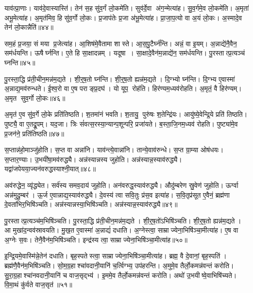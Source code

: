 याव॑त्प्रा॒णाः। याव॑दे॒वास्यास्ति॑। तेन॑ स॒ह सु॑व॒र्गं लो॒कमे॑ति। सुव॑र्दे॒वा अ॑ग॒न्मेत्या॑ह। सु॒व॒र्गमे॒व लो॒कमे॑ति। अ॒मृता॑ अभू॒मेत्या॑ह। अ॒मृत॑मिव॒ हि सु॑व॒र्गो लो॒कः। प्र॒जाप॑तेः प्र॒जा अ॑भू॒मेत्या॑ह। प्रा॒जा॒प॒त्यो वा अ॒यं लो॒कः। अ॒स्मादे॒व तेन॑ लो॒कान्नैति॑॥४४॥

सम॒हं प्र॒जया॒ सं मया प्र॒जेत्या॑ह। आ॒शिष॑मे॒वैतामा शास्ते। आ॒स॒पु॒टैर्घ्न॑न्ति। अन्नं॒ वा इ॒यम्। अ॒न्नाद्ये॑नै॒वैन॒ सम॑र्धयन्ति। ऊषैर्घ्नन्ति। ए॒ते हि सा॒क्षादन्नम्। यदूषा। सा॒क्षादे॒वैन॑म॒न्नाद्ये॑न॒ सम॑र्धयन्ति। पु॒रस्तात्प्र॒त्यञ्चं घ्नन्ति॥४५॥

पु॒रस्ता॒द्धि प्र॑ती॒चीन॒मन्न॑म॒द्यते। शी॒र्॒ष॒तो घ्न॑न्ति। शी॒र्॒ष॒तो ह्यन्न॑म॒द्यते। दि॒ग्भ्यो घ्न॑न्ति। दि॒ग्भ्य ए॒वास्मा॑ अ॒न्नाद्य॒मव॑रुन्धते। ई॒श्व॒रो वा ए॒ष पराङ्प्र॒दघ॑। यो यूप॒ रोह॑ति। हिर॑ण्यम॒ध्यव॑रोहति। अ॒मृतं॒ वै हिर॑ण्यम्। अ॒मृत सुव॒र्गो लो॒कः॥४६॥

अ॒मृत॑ ए॒व सु॑व॒र्गे लो॒के प्रति॑तिष्ठति। श॒तमा॑नं भवति। श॒तायु॒ पुरु॑षः श॒तेन्द्रि॑यः। आयु॑ष्ये॒वेन्द्रि॒ये प्रति॑ तिष्ठति। पुष्ट्यै॒ वा ए॒तद्रू॒पम्। यद॒जा। त्रिः सं॑वत्स॒रस्या॒न्यान्प॒शून्परि॒ प्रजा॑यते। ब॒स्ता॒जि॒नम॒ध्यव॑ रोहति। पुष्ट्या॑मे॒व प्र॒जन॑ने॒ प्रति॑तिष्ठति॥४७॥\anuvakamend[प॒रि॒धा॒पय॑ति गो॒धूमा॑ जुहोति॒ स्वं नैति॑ प्र॒त्यञ्चं घ्नन्ति लो॒को नव॑ च]

स॒प्तान्न॑हो॒माञ्जु॑होति। स॒प्त वा अन्ना॑नि। याव॑न्त्ये॒वान्ना॑नि। तान्ये॒वाव॑रुन्धे। स॒प्त ग्रा॒म्या ओष॑धयः। स॒प्तार॒ण्याः। उ॒भयी॑षा॒मव॑रुद्ध्यै। अन्न॑स्यान्नस्य जुहोति। अन्न॑स्यान्न॒स्या\-व॑रुद्ध्यै। यद्वा॑जपेयया॒ज्यन॑वरुद्धस्याश्नी॒यात्॥४८॥

अव॑रुद्धेन॒ व्यृ॑द्ध्येत। सर्व॑स्य समव॒दाय॑ जुहोति। अन॑वरुद्ध॒स्याव॑रुद्ध्यै। औदु॑म्बरेण स्रु॒वेण॑ जुहोति। ऊर्ग्वा अन्न॑मुदु॒म्बर॑। ऊ॒र्ज ए॒वान्नाद्य॒स्याव॑रुद्ध्यै। दे॒वस्य॑ त्वा सवि॒तुः प्र॑स॒व इत्या॑ह। स॒वि॒तृप्र॑सूत ए॒वैनं॒ ब्रह्म॑णा दे॒वता॑भिर॒भिषि॑ञ्चति। अन्न॑स्यान्नस्या॒भिषि॑ञ्चति। अन्न॑स्यान्न॒स्याव॑रुद्ध्यै॥४९॥

पु॒रस्तात्प्र॒त्यञ्च॑म॒भिषि॑ञ्चति। पु॒रस्ता॒द्धि प्र॑ती॒चीन॒मन्न॑म॒द्यते। शी॒र्॒ष॒तो॑ऽभिषि॑ञ्चति। शी॒र्॒ष॒तो ह्यन्न॑म॒द्यते। आ मुखा॑द॒न्वव॑स्रावयति। मु॒ख॒त ए॒वास्मा॑ अ॒न्नाद्यं॑ दधाति। अ॒ग्नेस्त्वा॒ साम्राज्येना॒भिषि॑ञ्चा॒मीत्या॑ह। ए॒ष वा अ॒ग्नेः स॒वः। तेनै॒वैन॑म॒भिषि॑ञ्चति। इन्द्र॑स्य त्वा॒ साम्राज्येना॒भिषि॑ञ्चा॒मीत्या॑ह॥५०॥

इ॒न्द्रि॒यमे॒वास्मि॑न्ने॒तेन॑ दधाति। बृह॒स्पतेस्त्वा॒ साम्राज्येना॒भि\-षि॑ञ्चा॒मीत्या॑ह। ब्रह्म॒ वै दे॒वानां॒ बृह॒स्पति॑। ब्रह्म॑णै॒वैन॑म॒भि\-षि॑ञ्चति। सो॒म॒ग्र॒हाश्चा॑वदानी॒यानि॑ च॒र्त्विग्भ्य॒ उप॑हरन्ति। अ॒मुमे॒व तैर्लो॒कमन्न॑वन्तं करोति। सु॒रा॒ग्र॒हाश्चा॑नवदानी॒यानि॑ च वाज॒सृद्भ्य॑। इ॒ममे॒व तैर्लो॒कमन्न॑वन्तं करोति। अथो॑ उ॒भयीष्वे॒वाभिषि॑च्यते। वि॒मा॒थं कु॑र्वते वाज॒सृत॑॥५१॥


